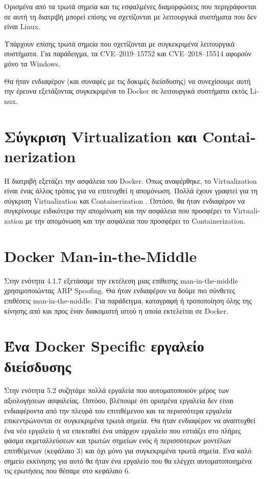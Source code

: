 Ορισμένα από τα τρωτά σημεία και τις εσφαλμένες διαμορφώσεις που περιγράφονται
σε αυτή τη διατριβή μπορεί επίσης να σχετίζονται με λειτουργικά συστήματα που
δεν είναι \textlatin{Linux}.


Υπάρχουν επίσης τρωτά σημεία που σχετίζονται με συγκεκριμένα λειτουργικά
συστήματα. Για παράδειγμα, τα \textlatin{CVE–2019–15752} και
\textlatin{CVE–2018–15514} αφορούν μόνο τα \textlatin{Windows}.

Θα ήταν ενδιαφέρον (και συναφές με τις δοκιμές διείσδυσης) να συνεχίσουμε
αυτή την έρευνα εξετάζοντας συγκεκριμένα το \textlatin{Docker} σε λειτουργικά
συστήματα εκτός \textlatin{Linux}.

\section{Σύγκριση \textlatin{Virtualization} και \textlatin{Containerization}}

Η διατριβή εξετάζει την ασφάλεια του \textlatin{Docker}. Όπως αναφέρθηκε,
το \textlatin{Virtualization} είναι ένας άλλος τρόπος για να
επιτευχθεί η απομόνωση. Πολλά έχουν γραφτεί για τη σύγκριση
\textlatin{Virtualization} και \textlatin{Containerization}
\cite{Virtualization-vs-Containerization-to-Support-PaaS}
\cite{Hypervisor-vs-Lightweight-Virtualization}
\cite{Updated-Performance-Comparison-Virtual-Machines-Containers}. Ωστόσο, θα
ήταν ενδιαφέρον να συγκρίνουμε ειδικότερα την απομόνωση και την ασφάλεια που
προσφέρει το \textlatin{Virtualization} με την απομόνωση και την ασφάλεια που
προσφέρει το \textlatin{Containerization}.


\section{\textlatin{Docker Man-in-the-Middle}}

Στην ενότητα 4.1.7 εξετάσαμε την εκτέλεση μιας επίθεσης
\textlatin{man-in-the-middle} χρησιμοποιώντας \textlatin{ARP Spoofing}. Θα ήταν
ενδιαφέρον να δούμε πιο σύνθετες επιθέσεις \textlatin{man-in-the-middle}. Για
παράδειγμα, καταγραφή ή τροποποίηση όλης της κίνησης από και προς έναν διακομιστή ιστού η
οποία εκτελείται σε \textlatin{Docker}.

\section{\textlatin{Ένα \textlatin{Docker Specific} εργαλείο διείσδυσης}}

Στην ενότητα 5.2 συζητάμε πολλά εργαλεία που αυτοματοποιούν μέρος των
αξιολογήσεων ασφαλείας. Ωστόσο, βλέπουμε ότι ορισμένα εργαλεία δεν είναι
ενδιαφέροντα από την πλευρά του επιτιθέμενου και τα περισσότερα εργαλεία
επικεντρώνονται σε συγκεκριμένα τρωτά σημεία. Θα ήταν ενδιαφέρον να αναπτυχθεί
ένα νέο εργαλείο ή να επεκταθεί ένα υπάρχον εργαλείο που εστιάζει στο
πλήρες φάσμα εκμεταλλεύσεων και τρωτών σημείων ενός ή περισσότερων μοντέλων
επιτιθέμενων (κεφάλαιο 3) και όχι μόνο για συγκεκριμένα τρωτά σημεία. Ένα καλό
σημείο εκκίνησης για αυτό θα ήταν ένα εργαλείο που θα ελέγχει αυτοματοποιημένα
τις ερωτήσεις που θέσαμε στο κεφάλαιο 6.
